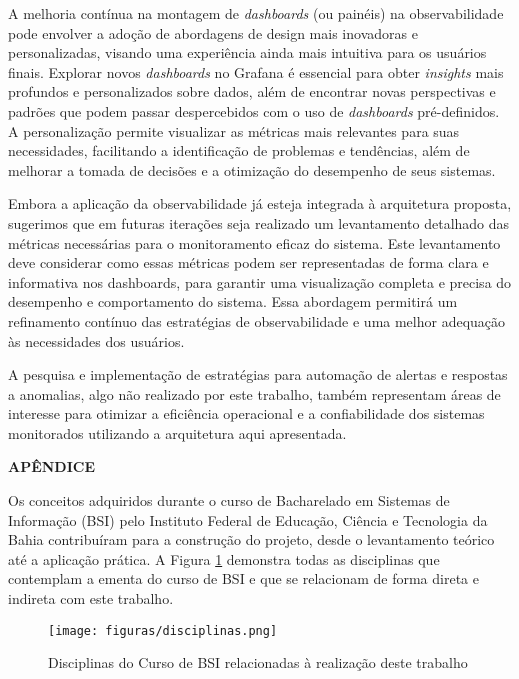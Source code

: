 \documentclass[12pt]{article}
\begin{document}
A melhoria contínua na montagem de \textit{dashboards} (ou painéis) na observabilidade pode envolver a adoção de abordagens de design mais inovadoras e personalizadas, visando uma experiência ainda mais intuitiva para os usuários finais. Explorar novos \textit{dashboards} no Grafana é essencial para obter \textit{insights} mais profundos e personalizados sobre dados, além de encontrar novas perspectivas e padrões que podem passar despercebidos com o uso de \textit{dashboards} pré-definidos. A personalização permite visualizar as métricas mais relevantes para suas necessidades, facilitando a identificação de problemas e tendências, além de melhorar a tomada de decisões e a otimização do desempenho de seus sistemas.

Embora a aplicação da observabilidade já esteja integrada à arquitetura proposta, sugerimos que em futuras iterações seja realizado um levantamento detalhado das métricas necessárias para o monitoramento eficaz do sistema. Este levantamento deve considerar como essas métricas podem ser representadas de forma clara e informativa nos dashboards, para garantir uma visualização completa e precisa do desempenho e comportamento do sistema. Essa abordagem permitirá um refinamento contínuo das estratégias de observabilidade e uma melhor adequação às necessidades dos usuários.

A pesquisa e implementação de estratégias para automação de alertas e respostas a anomalias, algo não realizado por este trabalho, também representam áreas de interesse para otimizar a eficiência operacional e a confiabilidade dos sistemas monitorados utilizando a arquitetura aqui apresentada.




\newpage

\noindent\textbf{APÊNDICE}

Os conceitos adquiridos durante o curso de Bacharelado em Sistemas de Informação (BSI) pelo Instituto Federal de Educação, Ciência e Tecnologia da Bahia contribuíram para a construção do projeto, desde o levantamento teórico até a aplicação prática. A Figura \ref{fig:disciplinas} demonstra todas as disciplinas que contemplam a ementa do curso de BSI e que se relacionam de forma direta e indireta com este trabalho.

\begin{figure}[!htb]
\centering
\texttt{[image: figuras/disciplinas.png]}
\caption{Disciplinas do Curso de BSI relacionadas à realização deste trabalho}
\label{fig:disciplinas}
\end{figure}
\end{document}
